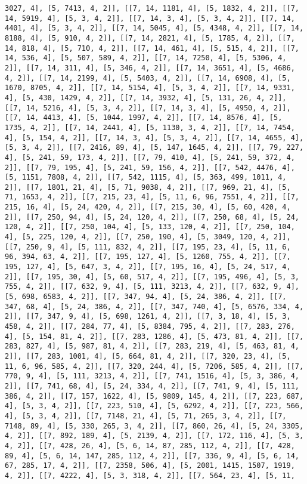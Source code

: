 \documentclass[12pt,fleqn]{article}\usepackage{../../common}
\begin{document}
\begin{verbatim}
3027, 4], [5, 7413, 4, 2]], [[7, 14, 1181, 4], [5, 1832, 4, 2]], [[7, 14, 5919, 4], [5, 3, 4, 2]], [[7, 14, 3, 4], [5, 3, 4, 2]], [[7, 14, 4401, 4], [5, 3, 4, 2]], [[7, 14, 5045, 4], [5, 4348, 4, 2]], [[7, 14, 8188, 4], [5, 910, 4, 2]], [[7, 14, 2821, 4], [5, 1785, 4, 2]], [[7, 14, 818, 4], [5, 710, 4, 2]], [[7, 14, 461, 4], [5, 515, 4, 2]], [[7, 14, 536, 4], [5, 507, 589, 4, 2]], [[7, 14, 7250, 4], [5, 5306, 4, 2]], [[7, 14, 311, 4], [5, 346, 4, 2]], [[7, 14, 3651, 4], [5, 4686, 4, 2]], [[7, 14, 2199, 4], [5, 5403, 4, 2]], [[7, 14, 6908, 4], [5, 1670, 8705, 4, 2]], [[7, 14, 5154, 4], [5, 3, 4, 2]], [[7, 14, 9331, 4], [5, 430, 1429, 4, 2]], [[7, 14, 3932, 4], [5, 131, 26, 4, 2]], [[7, 14, 5216, 4], [5, 3, 4, 2]], [[7, 14, 3, 4], [5, 4950, 4, 2]], [[7, 14, 4413, 4], [5, 1044, 1997, 4, 2]], [[7, 14, 8576, 4], [5, 1735, 4, 2]], [[7, 14, 2441, 4], [5, 1130, 3, 4, 2]], [[7, 14, 7454, 4], [5, 154, 4, 2]], [[7, 14, 3, 4], [5, 3, 4, 2]], [[7, 14, 4655, 4], [5, 3, 4, 2]], [[7, 2416, 89, 4], [5, 147, 1645, 4, 2]], [[7, 79, 227, 4], [5, 241, 59, 173, 4, 2]], [[7, 79, 410, 4], [5, 241, 59, 372, 4, 2]], [[7, 79, 195, 4], [5, 241, 59, 156, 4, 2]], [[7, 542, 4476, 4], [5, 1151, 7808, 4, 2]], [[7, 542, 1115, 4], [5, 363, 499, 1011, 4, 2]], [[7, 1801, 21, 4], [5, 71, 9038, 4, 2]], [[7, 969, 21, 4], [5, 71, 1653, 4, 2]], [[7, 215, 23, 4], [5, 11, 6, 96, 7551, 4, 2]], [[7, 215, 16, 4], [5, 24, 420, 4, 2]], [[7, 215, 30, 4], [5, 60, 420, 4, 2]], [[7, 250, 94, 4], [5, 24, 120, 4, 2]], [[7, 250, 68, 4], [5, 24, 120, 4, 2]], [[7, 250, 104, 4], [5, 133, 120, 4, 2]], [[7, 250, 104, 4], [5, 225, 120, 4, 2]], [[7, 250, 190, 4], [5, 3049, 120, 4, 2]], [[7, 250, 9, 4], [5, 111, 832, 4, 2]], [[7, 195, 23, 4], [5, 11, 6, 96, 394, 63, 4, 2]], [[7, 195, 127, 4], [5, 1260, 755, 4, 2]], [[7, 195, 127, 4], [5, 647, 3, 4, 2]], [[7, 195, 16, 4], [5, 24, 517, 4, 2]], [[7, 195, 30, 4], [5, 60, 517, 4, 2]], [[7, 195, 496, 4], [5, 3, 755, 4, 2]], [[7, 632, 9, 4], [5, 111, 3213, 4, 2]], [[7, 632, 9, 4], [5, 698, 6583, 4, 2]], [[7, 347, 94, 4], [5, 24, 386, 4, 2]], [[7, 347, 68, 4], [5, 24, 386, 4, 2]], [[7, 347, 740, 4], [5, 6576, 334, 4, 2]], [[7, 347, 9, 4], [5, 698, 1261, 4, 2]], [[7, 3, 18, 4], [5, 3, 458, 4, 2]], [[7, 284, 77, 4], [5, 8384, 795, 4, 2]], [[7, 283, 276, 4], [5, 154, 81, 4, 2]], [[7, 283, 1286, 4], [5, 473, 81, 4, 2]], [[7, 283, 827, 4], [5, 987, 81, 4, 2]], [[7, 283, 219, 4], [5, 463, 81, 4, 2]], [[7, 283, 1001, 4], [5, 664, 81, 4, 2]], [[7, 320, 23, 4], [5, 11, 6, 96, 585, 4, 2]], [[7, 320, 244, 4], [5, 7206, 585, 4, 2]], [[7, 770, 9, 4], [5, 111, 3213, 4, 2]], [[7, 741, 1516, 4], [5, 3, 386, 4, 2]], [[7, 741, 68, 4], [5, 24, 334, 4, 2]], [[7, 741, 9, 4], [5, 111, 386, 4, 2]], [[7, 157, 1622, 4], [5, 9809, 145, 4, 2]], [[7, 223, 687, 4], [5, 3, 4, 2]], [[7, 223, 510, 4], [5, 6292, 4, 2]], [[7, 223, 566, 4], [5, 3, 4, 2]], [[7, 7148, 21, 4], [5, 71, 265, 3, 4, 2]], [[7, 7148, 89, 4], [5, 330, 265, 3, 4, 2]], [[7, 860, 26, 4], [5, 24, 3305, 4, 2]], [[7, 892, 189, 4], [5, 2139, 4, 2]], [[7, 172, 116, 4], [5, 3, 4, 2]], [[7, 428, 26, 4], [5, 6, 14, 87, 285, 112, 4, 2]], [[7, 428, 89, 4], [5, 6, 14, 147, 285, 112, 4, 2]], [[7, 336, 9, 4], [5, 6, 14, 67, 285, 17, 4, 2]], [[7, 2358, 506, 4], [5, 2001, 1415, 1507, 1919, 4, 2]], [[7, 4222, 4], [5, 3, 318, 4, 2]], [[7, 564, 23, 4], [5, 11, 
\end{verbatim}
\end{document}
